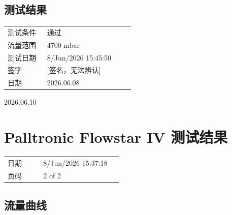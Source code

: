 \documentclass[UTF8,10pt,a4paper,fontset=fandol]{ctexart}
\newcommand{\fieldvalue}[1]{#1}
\newcommand{\handwritten}[1]{#1}
\begin{document}
\subsection{测试结果}

\begin{tabular}{@{}p{0.28\linewidth}p{0.62\linewidth}@{}}
测试条件 &
\fieldvalue{通过}
\\
流量范围 &
\fieldvalue{4700 mbar}
\\
测试日期 &
\fieldvalue{8/Jun/2026 15:45:50}
\\
签字 &
\fieldvalue{\handwritten{[签名，无法辨认]}}
\\
日期 &
\fieldvalue{\handwritten{2026.06.08}}
\end{tabular}

\handwritten{2026.06.10}

\section{Palltronic Flowstar IV 测试结果}

\begin{tabular}{@{}p{0.28\linewidth}p{0.62\linewidth}@{}}
日期 &
\fieldvalue{8/Jun/2026 15:37:18}
\\
页码 &
\fieldvalue{2 of 2}
\end{tabular}

\subsection{流量曲线}

\begin{center}
\end{center}
\end{document}
